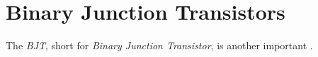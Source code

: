 \section{Binary Junction Transistors}\label{sec:BJTs}
\begin{definition}[BJT]\label{def:BJT}
  The \emph{BJT}, short for \emph{Binary Junction Transistor}, is another important .
\end{definition}


